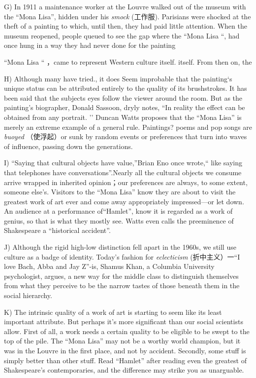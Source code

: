 \documentclass[UTF8,11pt]{ctexart}
\begin{document}
G) In 1911 a maintenance worker at the Louvre walked out of the museum with the “Mona Lisa”, hidden under his\textit{ smock} (工作服). Parisians were shocked at the theft of a painting to which, until then, they had paid little attention. When the museum reopened, people queued to see the gap where the “Mona Lisa “, had once hung in a way they had never done for the painting


“Mona Lisa “ ，came to represent Western culture itself. itself. From then on, the


H) Although many have tried., it does Seem improbable that the painting‘s unique status can be attributed entirely to the quality of its brushstrokes. It has been said that the subjects eyes follow the viewer around the room. But as the painting’s biographer, Donald Sassoon, dryly notes, “In reality the effect can be obtained from any portrait. ’’ Duncan Watts proposes that the “Mona Lisa” is merely an extreme example of a general rule. Paintings? poems and pop songs are\textit{ buoyed} （使浮起）or sunk by random events or preferences that turn into waves of influence, passing down the generations.


I) “Saying that cultural objects have value,”Brian Eno once wrote,“ like saying that telephones have conversations”.Nearly all the cultural objects we consume arrive wrapped in inherited opinion；our preferences are always, to some extent, someone else’s. Visitors to the “Mona Lisa” know they are about to visit the greatest work of art ever and come away appropriately impressed—or let down. An audience at a performance of“Hamlet”, know it is regarded as a work of genius, so that is what they mostly see. Watts even calls the preeminence of Shakespeare a “historical accident”.


J) Although the rigid high-low distinction fell apart in the 1960s, we still use culture as a badge of identity. Today’s fashion for \textit{eclecticism} (折中主义）一“I love Bach, Abba and Jay Z”-is, Shamus Khan, a Columbia University psychologist, argues, a new way for the middle class to distinguish themselves from what they perceive to be the narrow tastes of those beneath them in the social hierarchy.


K) The intrinsic quality of a work of art is starting to seem like its least important attribute. But perhaps it’s more significant than our social scientists allow. First of all, a work needs a certain quality to be eligible to be swept to the top of the pile. The “Mona Lisa” may not be a worthy world champion, but it was in the Louvre in the first place, and not by accident. Secondly, some stuff is simply better than other stuff. Read “Hamlet” after reading even the greatest of Shakespeare’s contemporaries, and the difference may strike you as unarguable.
\end{document}

